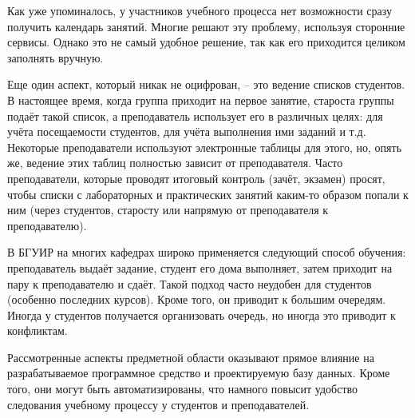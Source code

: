 Как уже упоминалось, у участников учебного процесса нет возможности сразу получить календарь занятий. Многие решают эту проблему, используя сторонние сервисы. Однако это не самый удобное решение, так как его приходится целиком заполнять вручную.

Еще один аспект, который никак не оцифрован, -- это ведение списков студентов. В настоящее время, когда группа приходит на первое занятие, староста группы подаёт такой список, а преподаватель использует его в различных целях: для учёта посещаемости студентов, для учёта выполнения ими заданий и т.д. Некоторые преподаватели используют электронные таблицы для этого, но, опять же, ведение этих таблиц полностью зависит от преподавателя. Часто преподаватели, которые проводят итоговый контроль (зачёт, экзамен) просят, чтобы списки с лабораторных и практических занятий каким-то образом попали к ним (через студентов, старосту или напрямую от преподавателя к преподавателю). 

В БГУИР на многих кафедрах широко применяется следующий способ обучения: преподаватель выдаёт задание, студент его дома выполняет, затем приходит на пару к преподавателю и сдаёт. Такой подход часто неудобен для студентов (особенно последних курсов). Кроме того, он приводит к большим очередям. Иногда у студентов получается организовать очередь, но иногда это приводит к конфликтам.

Рассмотренные аспекты предметной области оказывают прямое влияние на разрабатываемое программное средство и проектируемую базу данных. Кроме того, они могут быть автоматизированы, что намного повысит удобство следования учебному процессу у студентов и преподавателей.
